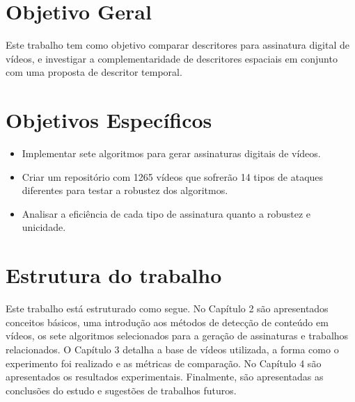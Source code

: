 
\section{Objetivo Geral}
\label{sec:objetivos}
Este trabalho tem como objetivo comparar descritores para assinatura digital de vídeos, e investigar a complementaridade de descritores espaciais em conjunto com uma proposta de descritor temporal.

\section{Objetivos Específicos}

\begin{itemize}
	\item Implementar sete algoritmos para gerar assinaturas digitais de vídeos.
	\item Criar um repositório com 1265 vídeos que sofrerão 14 tipos de ataques diferentes para testar a robustez dos algoritmos.
	\item Analisar a eficiência de cada tipo de assinatura quanto a robustez e unicidade.
\end{itemize}


\section{Estrutura do trabalho}
Este trabalho está estruturado como segue. No Capítulo 2 são apresentados conceitos básicos, uma introdução aos métodos de detecção de conteúdo em vídeos, os sete algoritmos selecionados para a geração de assinaturas e trabalhos relacionados. O Capítulo 3 detalha a base de vídeos utilizada, a forma como o experimento foi realizado e as métricas de comparação. No Capítulo 4 são apresentados os resultados experimentais. Finalmente, são apresentadas as conclusões do estudo e sugestões de trabalhos futuros.
